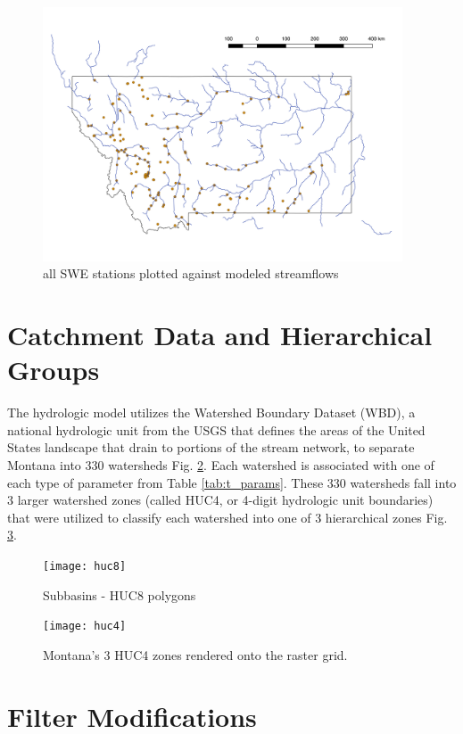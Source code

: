 \begin{figure}[h]
    \centering
    \includegraphics[width=0.95\textwidth]{stations}
    \caption{all SWE stations plotted against modeled streamflows}
    \label{fig:stations}
\end{figure}

\section{Catchment Data and Hierarchical Groups}

The hydrologic model utilizes the Watershed Boundary Dataset (WBD), a national hydrologic unit from the USGS that defines the areas of the United States landscape that drain to portions of the stream network, to separate Montana into 330 watersheds Fig. \ref{fig:huc8}. Each watershed is associated with one of each type of parameter from Table \ref{tab:t_params}. These 330 watersheds fall into 3 larger watershed zones (called HUC4, or 4-digit hydrologic unit boundaries) that were utilized to classify each watershed into one of 3 hierarchical zones Fig. \ref{fig:huc4}.

\begin{figure}[h]
    \centering
    \texttt{[image: huc8]}
    \caption{Subbasins - HUC8 polygons}
    \label{fig:huc8}
\end{figure}

\begin{figure}[h]
    \centering
    \texttt{[image: huc4]}
    \caption{Montana's 3 HUC4 zones rendered onto the raster grid.}
    \label{fig:huc4}
\end{figure}

\section{Filter Modifications}

